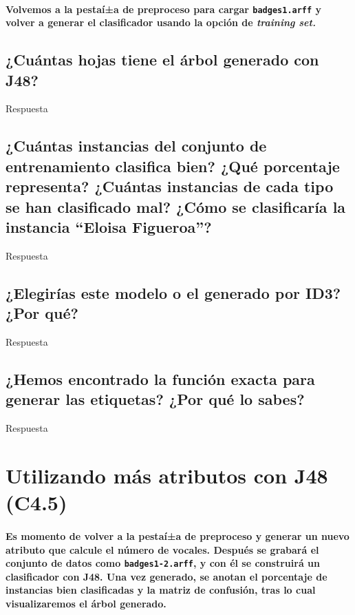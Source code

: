 \documentclass[12pt]{article}
\begin{document}
\paragraph{\small Volvemos a la pestaí±a de preproceso para cargar \texttt{badges1.arff}
y volver a generar el clasificador usando la opción de \emph{training set.}}

\subsection{\small ¿Cuántas hojas tiene el árbol generado con J48?}

Respuesta

\subsection{\small ¿Cuántas instancias del conjunto de entrenamiento clasifica bien?
¿Qué porcentaje representa? ¿Cuántas instancias de cada tipo se han clasificado
mal? ¿Cómo se clasificarí­a la instancia ``Eloisa Figueroa''?}

Respuesta

\subsection{\small ¿Elegirí­as este modelo o el generado por ID3? ¿Por qué?}

Respuesta

\subsection{\small ¿Hemos encontrado la función exacta para generar las etiquetas?
¿Por qué lo sabes?}

Respuesta

\newpage

\section{Utilizando más atributos con J48 (C4.5)}

\paragraph{\small Es momento de volver a la pestaí±a de preproceso y generar un
nuevo atributo que calcule el número de vocales. Después se grabará el conjunto
de datos como \texttt{badges1-2.arff}, y con él se construirá un clasificador
con J48. Una vez generado, se anotan el porcentaje de instancias bien
clasificadas y la matriz de confusión, tras lo cual visualizaremos el árbol
generado.}
\end{document}
